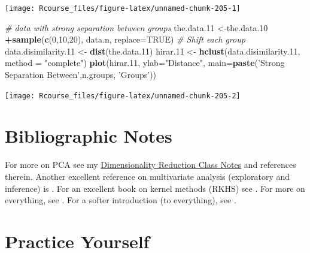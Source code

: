 \documentclass[]{book}
\newenvironment{Shaded}{\begin{snugshade}}{\end{snugshade}}
\newcommand{\KeywordTok}[1]{\textcolor[rgb]{0.13,0.29,0.53}{\textbf{#1}}}
\newcommand{\DataTypeTok}[1]{\textcolor[rgb]{0.13,0.29,0.53}{#1}}
\newcommand{\DecValTok}[1]{\textcolor[rgb]{0.00,0.00,0.81}{#1}}
\newcommand{\StringTok}[1]{\textcolor[rgb]{0.31,0.60,0.02}{#1}}
\newcommand{\CommentTok}[1]{\textcolor[rgb]{0.56,0.35,0.01}{\textit{#1}}}
\newcommand{\OtherTok}[1]{\textcolor[rgb]{0.56,0.35,0.01}{#1}}
\newcommand{\OperatorTok}[1]{\textcolor[rgb]{0.81,0.36,0.00}{\textbf{#1}}}
\newcommand{\NormalTok}[1]{#1}
\theoremstyle{definition}
\theoremstyle{definition}
\theoremstyle{definition}
\theoremstyle{remark}
\begin{document}
\texttt{[image: Rcourse\_files/figure-latex/unnamed-chunk-205-1]}

\begin{Shaded}
\begin{Highlighting}[]
\CommentTok{# data with strong separation between groups}
\NormalTok{the.data.}\DecValTok{11}\NormalTok{ <-the.data.}\DecValTok{10} \OperatorTok{+}\KeywordTok{sample}\NormalTok{(}\KeywordTok{c}\NormalTok{(}\DecValTok{0}\NormalTok{,}\DecValTok{10}\NormalTok{,}\DecValTok{20}\NormalTok{), data.n, }\DataTypeTok{replace=}\OtherTok{TRUE}\NormalTok{) }\CommentTok{# Shift each group }
\NormalTok{data.disimilarity.}\DecValTok{11}\NormalTok{ <-}\StringTok{ }\KeywordTok{dist}\NormalTok{(the.data.}\DecValTok{11}\NormalTok{)}
\NormalTok{hirar.}\DecValTok{11}\NormalTok{ <-}\StringTok{ }\KeywordTok{hclust}\NormalTok{(data.disimilarity.}\DecValTok{11}\NormalTok{, }\DataTypeTok{method =} \StringTok{"complete"}\NormalTok{)}
\KeywordTok{plot}\NormalTok{(hirar.}\DecValTok{11}\NormalTok{, }\DataTypeTok{ylab=}\StringTok{"Distance"}\NormalTok{, }\DataTypeTok{main=}\KeywordTok{paste}\NormalTok{(}\StringTok{'Strong Separation Between'}\NormalTok{,n.groups, }\StringTok{'Groups'}\NormalTok{))}
\end{Highlighting}
\end{Shaded}

\texttt{[image: Rcourse\_files/figure-latex/unnamed-chunk-205-2]}

\section{Bibliographic Notes}\label{bibliographic-notes-7}

For more on PCA see my
\href{https://github.com/johnros/dim_reduce/blob/master/dim_reduce.pdf}{Dimensionality
Reduction Class Notes} and references therein. Another excellent
reference on multivariate analysis (exploratory and inference) is
\citet{izenman2008modern}. For an excellent book on kernel methods
(RKHS) see \citet{shawe2004kernel}. For more on everything, see
\citet{friedman2001elements}. For a softer introduction (to everything),
see \citet{james2013introduction}.

\section{Practice Yourself}\label{practice-yourself-7}
\end{document}
